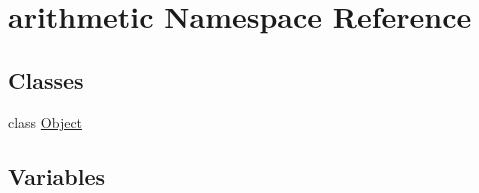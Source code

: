\hypertarget{namespacearithmetic}{}\section{arithmetic Namespace Reference}
\label{namespacearithmetic}
\subsection*{Classes}
\begin{DoxyCompactItemize}
\item 
class \hyperlink{classarithmetic_1_1Object}{Object}
\end{DoxyCompactItemize}
\subsection*{Variables}
